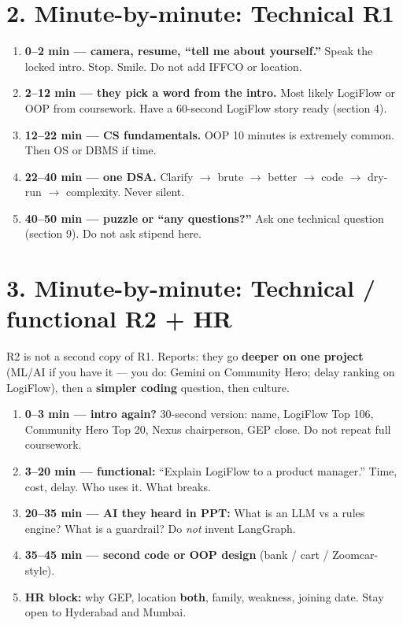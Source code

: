 \documentclass[a4paper,9.5pt]{extarticle}
\begin{document}
\section{2. Minute-by-minute: Technical R1}
\begin{enumerate}[leftmargin=1.3em, itemsep=2pt]
  \item \textbf{0--2 min --- camera, resume, ``tell me about yourself.''} Speak the locked intro. Stop. Smile. Do not add IFFCO or location.
  \item \textbf{2--12 min --- they pick a word from the intro.} Most likely LogiFlow or OOP from coursework. Have a 60-second LogiFlow story ready (section 4).
  \item \textbf{12--22 min --- CS fundamentals.} OOP 10 minutes is extremely common. Then OS or DBMS if time.
  \item \textbf{22--40 min --- one DSA.} Clarify $\to$ brute $\to$ better $\to$ code $\to$ dry-run $\to$ complexity. Never silent.
  \item \textbf{40--50 min --- puzzle or ``any questions?''} Ask one technical question (section 9). Do not ask stipend here.
\end{enumerate}

\section{3. Minute-by-minute: Technical / functional R2 + HR}
R2 is not a second copy of R1. Reports: they go \textbf{deeper on one project} (ML/AI if you have it --- you do: Gemini on Community Hero; delay ranking on LogiFlow), then a \textbf{simpler coding} question, then culture.

\begin{enumerate}[leftmargin=1.3em, itemsep=2pt]
  \item \textbf{0--3 min --- intro again?} 30-second version: name, LogiFlow Top 106, Community Hero Top 20, Nexus chairperson, GEP close. Do not repeat full coursework.
  \item \textbf{3--20 min --- functional:} ``Explain LogiFlow to a product manager.'' Time, cost, delay. Who uses it. What breaks.
  \item \textbf{20--35 min --- AI they heard in PPT:} What is an LLM vs a rules engine? What is a guardrail? Do \emph{not} invent LangGraph.
  \item \textbf{35--45 min --- second code or OOP design} (bank / cart / Zoomcar-style).
  \item \textbf{HR block:} why GEP, location \textbf{both}, family, weakness, joining date. Stay open to Hyderabad and Mumbai.
\end{enumerate}
\end{document}
